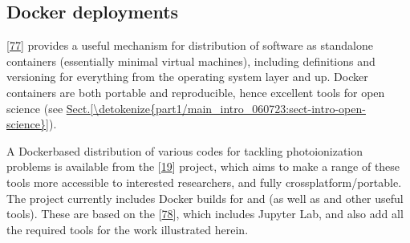 \documentclass[letterpaper,table,10pt,english]{jupyterBook}
\begin{document}
\subsection{Docker deployments}
\label{\detokenize{part1/platform_intro_070723:docker-deployments}}\label{\detokenize{part1/platform_intro_070723:sect-platform-docker}}
\sphinxAtStartPar
{} {[}\hyperlink{cite.backmatter/bibliography:id588}{77}{]} provides a useful mechanism for distribution of software as stand\sphinxhyphen{}alone containers (essentially minimal virtual machines), including definitions and versioning for everything from the operating system layer and up. Docker containers are both portable and reproducible, hence excellent tools for open science (see \hyperref[\detokenize{part1/main_intro_060723:sect-intro-open-science}]{Sect.\@ \ref{\detokenize{part1/main_intro_060723:sect-intro-open-science}}}).

\sphinxAtStartPar
A Docker\sphinxhyphen{}based distribution of various codes for tackling
photoionization problems is available from the  {[}\hyperlink{cite.backmatter/bibliography:id687}{19}{]}
project, which aims to make a range of these tools more accessible to
interested researchers, and fully cross\sphinxhyphen{}platform/portable. The project currently includes Docker builds for  and  (as well as  and other useful tools). These are based on the  {[}\hyperlink{cite.backmatter/bibliography:id713}{78}{]}, which includes Jupyter Lab, and also add all the required tools for the work illustrated herein.
\end{document}
